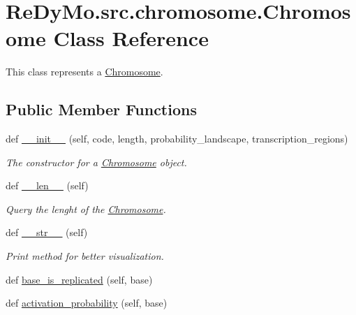 \hypertarget{classReDyMo_1_1src_1_1chromosome_1_1Chromosome}{}\section{Re\+Dy\+Mo.\+src.\+chromosome.\+Chromosome Class Reference}
\label{classReDyMo_1_1src_1_1chromosome_1_1Chromosome}


This class represents a \mbox{\hyperlink{classReDyMo_1_1src_1_1chromosome_1_1Chromosome}{Chromosome}}.  


\subsection*{Public Member Functions}
\begin{DoxyCompactItemize}
\item 
def \mbox{\hyperlink{classReDyMo_1_1src_1_1chromosome_1_1Chromosome_a23a1edc86d3d3cd3d8284911a66271f5}{\+\_\+\+\_\+init\+\_\+\+\_\+}} (self, code, length, probability\+\_\+landscape, transcription\+\_\+regions)
\begin{DoxyCompactList}\small\item\em The constructor for a \mbox{\hyperlink{classReDyMo_1_1src_1_1chromosome_1_1Chromosome}{Chromosome}} object. \end{DoxyCompactList}\item 
def \mbox{\hyperlink{classReDyMo_1_1src_1_1chromosome_1_1Chromosome_a2af2acd01f59ca72cdfc8e714f9bc3f8}{\+\_\+\+\_\+len\+\_\+\+\_\+}} (self)
\begin{DoxyCompactList}\small\item\em Query the lenght of the \mbox{\hyperlink{classReDyMo_1_1src_1_1chromosome_1_1Chromosome}{Chromosome}}. \end{DoxyCompactList}\item 
def \mbox{\hyperlink{classReDyMo_1_1src_1_1chromosome_1_1Chromosome_a95d9a66f3651a2e6ac0f7141f966c17d}{\+\_\+\+\_\+str\+\_\+\+\_\+}} (self)
\begin{DoxyCompactList}\small\item\em Print method for better visualization. \end{DoxyCompactList}\item 
def \mbox{\hyperlink{classReDyMo_1_1src_1_1chromosome_1_1Chromosome_a1dba7152914a8f8006a5ddfcaad82c31}{base\+\_\+is\+\_\+replicated}} (self, base)
\item 
def \mbox{\hyperlink{classReDyMo_1_1src_1_1chromosome_1_1Chromosome_ae1793cc7315be7cffaf4c1ab9385ba89}{activation\+\_\+probability}} (self, base)

\end{DoxyCompactItemize}
